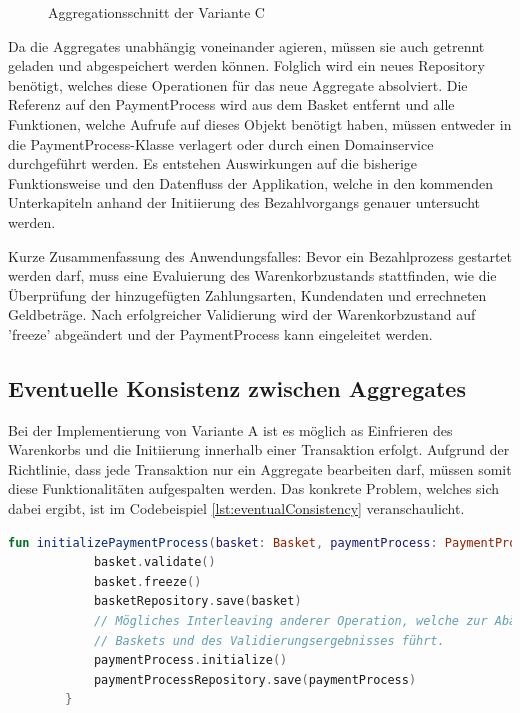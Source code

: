 \begin{figure}[htbp]
	\centering
	
	\caption{Aggregationsschnitt der Variante C}
	\label{fig:VarC}
\end{figure}

Da die Aggregates unabhängig voneinander agieren, müssen sie auch getrennt geladen und abgespeichert werden können. Folglich wird ein neues Repository benötigt, welches diese Operationen für das neue Aggregate absolviert. Die Referenz auf den PaymentProcess wird aus dem Basket entfernt und alle Funktionen, welche Aufrufe auf dieses Objekt benötigt haben, müssen entweder in die PaymentProcess-Klasse verlagert oder durch einen Domainservice durchgeführt werden. Es entstehen Auswirkungen auf die bisherige Funktionsweise und den Datenfluss der Applikation, welche in den kommenden Unterkapiteln anhand der Initiierung des Bezahlvorgangs genauer untersucht werden.

Kurze Zusammenfassung des Anwendungsfalles: 
Bevor ein Bezahlprozess gestartet werden darf, muss eine Evaluierung des Warenkorbzustands stattfinden, wie die Überprüfung der hinzugefügten Zahlungsarten, Kundendaten und errechneten Geldbeträge. Nach erfolgreicher Validierung wird der Warenkorbzustand auf 'freeze' abgeändert und der PaymentProcess kann eingeleitet werden.

\subsection{Eventuelle Konsistenz zwischen Aggregates}

Bei der Implementierung von Variante A ist es möglich as Einfrieren des Warenkorbs und die Initiierung innerhalb einer Transaktion erfolgt. Aufgrund der Richtlinie, dass jede Transaktion nur ein Aggregate bearbeiten darf, müssen somit diese Funktionalitäten aufgespalten werden. Das konkrete Problem, welches sich dabei ergibt, ist im Codebeispiel \ref{lst:eventualConsistency} veranschaulicht.

\begin{minipage}{\linewidth} %
	\begin{lstlisting}[caption={Getrennte Transaktionen für die Initiierung des Bezahlvorgangs}, label={lst:eventualConsistency}, language=Kotlin]
		fun initializePaymentProcess(basket: Basket, paymentProcess: PaymentProcess) {
			basket.validate()
			basket.freeze()
			basketRepository.save(basket)
			// Mögliches Interleaving anderer Operation, welche zur Abänderung des
			// Baskets und des Validierungsergebnisses führt.
			paymentProcess.initialize()
			paymentProcessRepository.save(paymentProcess)
		}
	\end{lstlisting}
\end{minipage}

